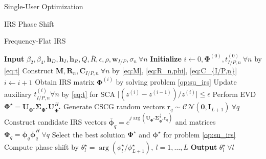 \documentclass{IEEEtran}
\begin{document}
\begin{section}{Single-User Optimization}
\begin{subsection}{IRS Phase Shift}
\begin{subsubsection}{Frequency-Flat IRS}
			\begin{algorithm}
				\caption{FF-IRS: Phase Shift}
				\label{al:ff_irs}
				\begin{algorithmic}[1]
					\State \textbf{Input} $\beta_2,\beta_4,\boldsymbol{h}_D,\boldsymbol{h}_I,\boldsymbol{h}_R,Q,\bar{R},\epsilon,\rho,\boldsymbol{w}_{I/P},\sigma_n \ \forall n$
					\State \textbf{Initialize} $i \gets 0,\boldsymbol{\Phi}^{(0)},t_{I/P,n}^{(0)}\ \forall n$ by \ref{eq:t}
					\State Construct $\boldsymbol{M},\boldsymbol{R}_n,\boldsymbol{C}_{I/P,n} \ \forall n$ by \ref{eq:M}, \ref{eq:R_n,phi}, \ref{eq:C_{I/P,n}}
					\Repeat
					\State $i \gets i + 1$
					\State Obtain IRS matrix $\boldsymbol{\Phi}^{(i)}$ by solving problem \ref{op:su_irs}
					\State Update auxiliary $t_{I/P,n}^{(i)} \forall n$ by \ref{eq:t} for SCA
					\Until $\lvert (z^{(i)}-z^{(i-1)}) / z^{(i)} \rvert \le \epsilon$
					\State Perform EVD $\boldsymbol{\Phi}^{\star}=\boldsymbol{U}_{\boldsymbol{\Phi}^{\star}}\boldsymbol{\Sigma}_{\boldsymbol{\Phi}^{\star}}\boldsymbol{U}_{\boldsymbol{\Phi}^{\star}}^H$
					\State Generate CSCG random vectors $\boldsymbol{r}_q \sim \mathcal{CN}(\boldsymbol{0},\boldsymbol{I}_{L+1}) \ \forall q$
					\State Construct candidate IRS vectors $\bar{\boldsymbol{\phi}}_q=e^{j\arg\left(\boldsymbol{U}_{\boldsymbol{\Phi}^{\star}}\boldsymbol{\Sigma}_{\boldsymbol{\Phi}^{\star}}^{\frac{1}{2}}\boldsymbol{r}_q\right)}$ and matrices $\boldsymbol{\Phi}_q=\bar{\boldsymbol{\phi}}_q\bar{\boldsymbol{\phi}}_q^H  \ \forall q$
					\State Select the best solution $\boldsymbol{\Phi}^\star$ and $\boldsymbol{\phi}^\star$ for problem \ref{op:su_irs}
					\State Compute phase shift by $\theta_l^\star=\arg(\phi_l^\star/\phi_{L+1}^\star), \ l=1,\dots,L$
					\State \textbf{Output} $\theta_l^\star \ \forall l$
				\end{algorithmic}
			\end{algorithm}
		\end{subsubsection}
	\end{subsection}


\end{section}
\end{document}
